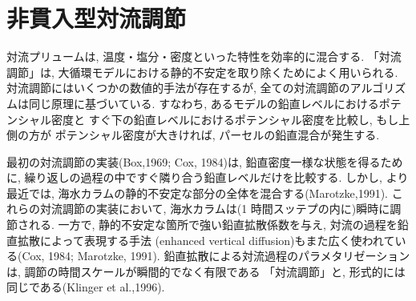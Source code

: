 \section{非貫入型対流調節}
対流プリュームは, 温度・塩分・密度といった特性を効率的に混合する.
「対流調節」は, 大循環モデルにおける静的不安定を取り除くためによく用いられる.
対流調節にはいくつかの数値的手法が存在するが, 全ての対流調節のアルゴリズムは同じ原理に基づいている.
すなわち, あるモデルの鉛直レベルにおけるポテンシャル密度と
すぐ下の鉛直レベルにおけるポテンシャル密度を比較し, もし上側の方が
ポテンシャル密度が大きければ, パーセルの鉛直混合が発生する.

最初の対流調節の実装(Box,1969; Cox, 1984)は, 鉛直密度一様な状態を得るために,
繰り返しの過程の中ですぐ隣り合う鉛直レベルだけを比較する.
しかし, より最近では, 海水カラムの静的不安定な部分の全体を混合する(Marotzke,1991).
これらの対流調節の実装において, 海水カラムは(1 時間スッテプの内に)瞬時に調節される.
一方で, 静的不安定な箇所で強い鉛直拡散係数を与え, 対流の過程を鉛直拡散によって表現する手法
(enhanced vertical diffusion)もまた広く使われている(Cox, 1984; Marotzke, 1991).
鉛直拡散による対流過程のパラメタリゼーションは, 調節の時間スケールが瞬間的でなく有限である
「対流調節」と, 形式的には同じである(Klinger et al.,1996).

